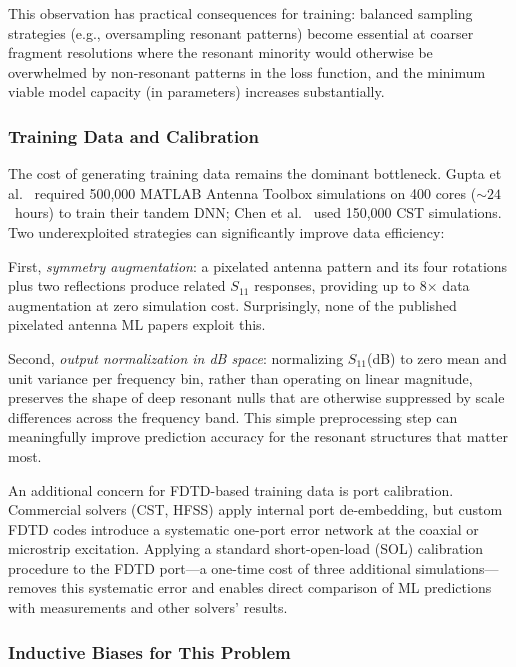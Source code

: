 This observation has practical consequences for training: balanced sampling strategies (e.g., oversampling resonant patterns) become essential at coarser fragment resolutions where the resonant minority would otherwise be overwhelmed by non-resonant patterns in the loss function, and the minimum viable model capacity (in parameters) increases substantially.

\subsubsection{Training Data and Calibration}

The cost of generating training data remains the dominant bottleneck.  Gupta et al.\ \cite{Gupta2023Tandem} required 500,000 MATLAB Antenna Toolbox simulations on 400 cores ($\sim\!24$~hours) to train their tandem DNN; Chen et al.\ \cite{Chen2025InverseDesignDL} used 150,000 CST simulations.  Two underexploited strategies can significantly improve data efficiency:

First, \emph{symmetry augmentation}: a pixelated antenna pattern and its four rotations plus two reflections produce related $S_{11}$ responses, providing up to 8$\times$ data augmentation at zero simulation cost.  Surprisingly, none of the published pixelated antenna ML papers exploit this.

Second, \emph{output normalization in dB space}: normalizing $S_{11}$(dB) to zero mean and unit variance per frequency bin, rather than operating on linear magnitude, preserves the shape of deep resonant nulls that are otherwise suppressed by scale differences across the frequency band.  This simple preprocessing step can meaningfully improve prediction accuracy for the resonant structures that matter most.

An additional concern for FDTD-based training data is port calibration.  Commercial solvers (CST, HFSS) apply internal port de-embedding, but custom FDTD codes introduce a systematic one-port error network at the coaxial or microstrip excitation.  Applying a standard short-open-load (SOL) calibration procedure to the FDTD port---a one-time cost of three additional simulations---removes this systematic error and enables direct comparison of ML predictions with measurements and other solvers' results.

\subsubsection{Inductive Biases for This Problem}

